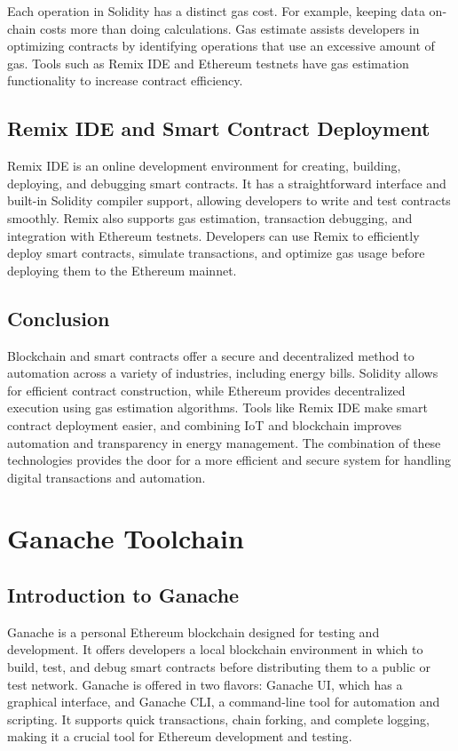 \documentclass[a4paper,12pt]{report}
\begin{document}
 Each operation in Solidity has a distinct gas cost.  For example, keeping data on-chain costs more than doing calculations.  Gas estimate assists developers in optimizing contracts by identifying operations that use an excessive amount of gas.  Tools such as Remix IDE and Ethereum testnets have gas estimation functionality to increase contract efficiency.


 
 \section{Remix IDE and Smart Contract Deployment}
 Remix IDE is an online development environment for creating, building, deploying, and debugging smart contracts.  It has a straightforward interface and built-in Solidity compiler support, allowing developers to write and test contracts smoothly.  Remix also supports gas estimation, transaction debugging, and integration with Ethereum testnets.  Developers can use Remix to efficiently deploy smart contracts, simulate transactions, and optimize gas usage before deploying them to the Ethereum mainnet.


 \section{Conclusion}
 Blockchain and smart contracts offer a secure and decentralized method to automation across a variety of industries, including energy bills.  Solidity allows for efficient contract construction, while Ethereum provides decentralized execution using gas estimation algorithms.  Tools like Remix IDE make smart contract deployment easier, and combining IoT and blockchain improves automation and transparency in energy management.  The combination of these technologies provides the door for a more efficient and secure system for handling digital transactions and automation.

  

 \chapter{Ganache Toolchain}

\section{Introduction to Ganache}
Ganache is a personal Ethereum blockchain designed for testing and development.  It offers developers a local blockchain environment in which to build, test, and debug smart contracts before distributing them to a public or test network\cite{brightwell2015overview}.  Ganache is offered in two flavors: Ganache UI, which has a graphical interface, and Ganache CLI, a command-line tool for automation and scripting\cite{gibson2016review}.  It supports quick transactions, chain forking, and complete logging, making it a crucial tool for Ethereum development and testing\cite{wang2017review}.
\end{document}
